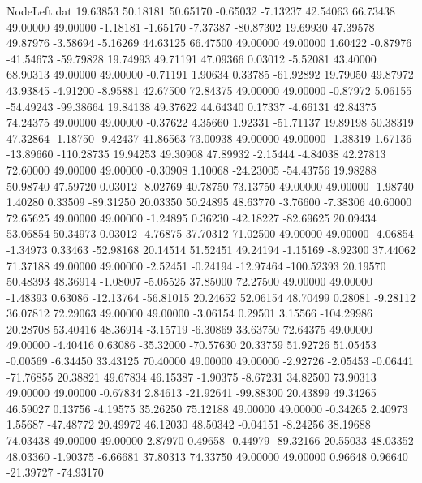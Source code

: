 \begin{filecontents}{NodeLeft.dat}
  19.63853   50.18181   50.65170    -0.65032   -7.13237   42.54063   66.73438   49.00000   49.00000   -1.18181   -1.65170   -7.37387  -80.87302
  19.69930   47.39578   49.87976    -3.58694   -5.16269   44.63125   66.47500   49.00000   49.00000    1.60422   -0.87976  -41.54673  -59.79828
  19.74993   49.71191   47.09366     0.03012   -5.52081   43.40000   68.90313   49.00000   49.00000   -0.71191    1.90634    0.33785  -61.92892
  19.79050   49.87972   43.93845    -4.91200   -8.95881   42.67500   72.84375   49.00000   49.00000   -0.87972    5.06155  -54.49243  -99.38664
  19.84138   49.37622   44.64340     0.17337   -4.66131   42.84375   74.24375   49.00000   49.00000   -0.37622    4.35660    1.92331  -51.71137
  19.89198   50.38319   47.32864    -1.18750   -9.42437   41.86563   73.00938   49.00000   49.00000   -1.38319    1.67136  -13.89660 -110.28735
  19.94253   49.30908   47.89932    -2.15444   -4.84038   42.27813   72.60000   49.00000   49.00000   -0.30908    1.10068  -24.23005  -54.43756
  19.98288   50.98740   47.59720     0.03012   -8.02769   40.78750   73.13750   49.00000   49.00000   -1.98740    1.40280    0.33509  -89.31250
  20.03350   50.24895   48.63770    -3.76600   -7.38306   40.60000   72.65625   49.00000   49.00000   -1.24895    0.36230  -42.18227  -82.69625
  20.09434   53.06854   50.34973     0.03012   -4.76875   37.70312   71.02500   49.00000   49.00000   -4.06854   -1.34973    0.33463  -52.98168
  20.14514   51.52451   49.24194    -1.15169   -8.92300   37.44062   71.37188   49.00000   49.00000   -2.52451   -0.24194  -12.97464 -100.52393
  20.19570   50.48393   48.36914    -1.08007   -5.05525   37.85000   72.27500   49.00000   49.00000   -1.48393    0.63086  -12.13764  -56.81015
  20.24652   52.06154   48.70499     0.28081   -9.28112   36.07812   72.29063   49.00000   49.00000   -3.06154    0.29501    3.15566 -104.29986
  20.28708   53.40416   48.36914    -3.15719   -6.30869   33.63750   72.64375   49.00000   49.00000   -4.40416    0.63086  -35.32000  -70.57630
  20.33759   51.92726   51.05453    -0.00569   -6.34450   33.43125   70.40000   49.00000   49.00000   -2.92726   -2.05453   -0.06441  -71.76855
  20.38821   49.67834   46.15387    -1.90375   -8.67231   34.82500   73.90313   49.00000   49.00000   -0.67834    2.84613  -21.92641  -99.88300
  20.43899   49.34265   46.59027     0.13756   -4.19575   35.26250   75.12188   49.00000   49.00000   -0.34265    2.40973    1.55687  -47.48772
  20.49972   46.12030   48.50342    -0.04151   -8.24256   38.19688   74.03438   49.00000   49.00000    2.87970    0.49658   -0.44979  -89.32166
  20.55033   48.03352   48.03360    -1.90375   -6.66681   37.80313   74.33750   49.00000   49.00000    0.96648    0.96640  -21.39727  -74.93170

\end{filecontents}
